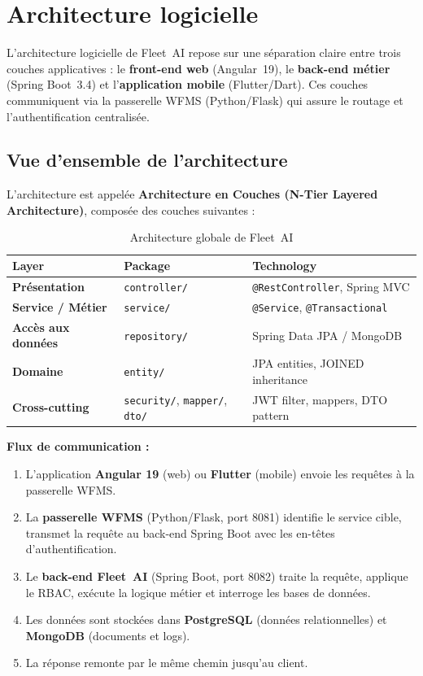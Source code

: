 \section{Architecture logicielle}

L'architecture logicielle de Fleet~AI repose sur une séparation claire entre trois couches applicatives : le \textbf{front-end web} (Angular~19), le \textbf{back-end métier} (Spring Boot~3.4) et l'\textbf{application mobile} (Flutter/Dart). Ces couches communiquent via la passerelle WFMS (Python/Flask) qui assure le routage et l'authentification centralisée.

\subsection{Vue d'ensemble de l'architecture}

L'architecture est appelée \textbf{Architecture en Couches (N-Tier Layered Architecture)}, composée des couches suivantes :

\begin{table}[H]
\centering
\renewcommand{\arraystretch}{1.4}
\begin{tabular}{|>{\bfseries}p{2.8cm}|p{3.8cm}|p{5.5cm}|}
\hline
\rowcolor{pghGreen!20}
\textbf{Layer} & \textbf{Package} & \textbf{Technology} \\
\hline
Présentation & \texttt{controller/} & \texttt{@RestController}, Spring MVC \\
\hline
Service / Métier & \texttt{service/} & \texttt{@Service}, \texttt{@Transactional} \\
\hline
Accès aux données & \texttt{repository/} & Spring Data JPA / MongoDB \\
\hline
Domaine & \texttt{entity/} & JPA entities, JOINED inheritance \\
\hline
Cross-cutting & \texttt{security/}, \texttt{mapper/}, \texttt{dto/} & JWT filter, mappers, DTO pattern \\
\hline
\end{tabular}
\caption{Architecture globale de Fleet~AI}
\label{fig:architecture-globale}
\end{table}

\textbf{Flux de communication :}
\begin{enumerate}
    \item L'application \textbf{Angular 19} (web) ou \textbf{Flutter} (mobile) envoie les requêtes à la passerelle WFMS.
    \item La \textbf{passerelle WFMS} (Python/Flask, port 8081) identifie le service cible, transmet la requête au back-end Spring Boot avec les en-têtes d'authentification.
    \item Le \textbf{back-end Fleet~AI} (Spring Boot, port 8082) traite la requête, applique le RBAC, exécute la logique métier et interroge les bases de données.
    \item Les données sont stockées dans \textbf{PostgreSQL} (données relationnelles) et \textbf{MongoDB} (documents et logs).
    \item La réponse remonte par le même chemin jusqu'au client.
\end{enumerate}

